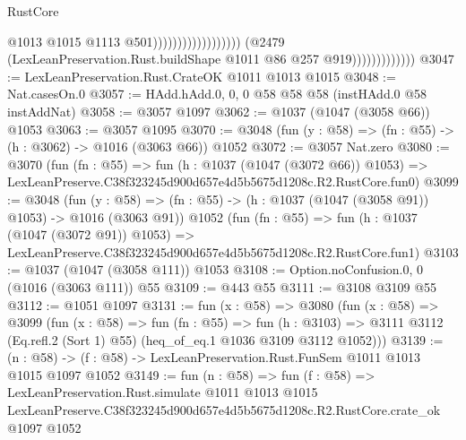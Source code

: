 \begin{lexlean}{RustCore}
\begin{coremodule}
                                                              @1013
                                                              @1015
                                                              @1113
                                                              @501))))))))))))))))))
                          (@2479
                            (LexLeanPreservation.Rust.buildShape @1011 @86 @257 @919)))))))))))))
@3047 := LexLeanPreservation.Rust.CrateOK @1011 @1013 @1015
@3048 := Nat.casesOn.{0}
@3057 := HAdd.hAdd.{0, 0, 0} @58 @58 @58 (instHAdd.{0} @58 instAddNat)
@3058 := @3057 @1097
@3062 := @1037 (@1047 (@3058 @66)) @1053
@3063 := @3057 @1095
@3070 := @3048 (fun (y : @58) => (fn : @55) -> (h : @3062) -> @1016 (@3063 @66)) @1052
@3072 := @3057 Nat.zero
@3080 := @3070
    (fun (fn : @55) =>
    fun (h : @1037 (@1047 (@3072 @66)) @1053) =>
    LexLeanPreserve.C38f323245d900d657e4d5b5675d1208c.R2.RustCore.fun0)
@3099 := @3048
    (fun (y : @58) => (fn : @55) -> (h : @1037 (@1047 (@3058 @91)) @1053) -> @1016 (@3063 @91))
    @1052
    (fun (fn : @55) =>
    fun (h : @1037 (@1047 (@3072 @91)) @1053) =>
    LexLeanPreserve.C38f323245d900d657e4d5b5675d1208c.R2.RustCore.fun1)
@3103 := @1037 (@1047 (@3058 @111)) @1053
@3108 := Option.noConfusion.{0, 0} (@1016 (@3063 @111)) @55
@3109 := @443 @55
@3111 := @3108 @3109 @55
@3112 := @1051 @1097
@3131 := fun (x : @58) =>
  @3080
    (fun (x : @58) =>
    @3099
      (fun (x : @58) =>
      fun (fn : @55) =>
      fun (h : @3103) =>
      @3111 @3112 (Eq.refl.{2} (Sort 1) @55) (heq_of_eq.{1} @1036 @3109 @3112 @1052)))
@3139 := (n : @58) -> (f : @58) -> LexLeanPreservation.Rust.FunSem @1011 @1013 @1015 @1097 @1052
@3149 := fun (n : @58) =>
  fun (f : @58) =>
  LexLeanPreservation.Rust.simulate
    @1011
    @1013
    @1015
    LexLeanPreserve.C38f323245d900d657e4d5b5675d1208c.R2.RustCore.crate_ok
    @1097
    @1052
\end{coremodule}
\end{lexlean}
